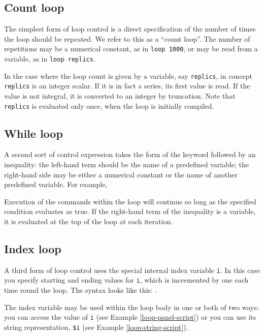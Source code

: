 \subsection{Count loop}
\label{loop-count}

The simplest form of loop control is a direct specification of the
number of times the loop should be repeated.  We refer to this as a
``count loop''.  The number of repetitions may be a numerical
constant, as in \verb+loop 1000+, or may be read from a variable, as
in \verb+loop replics+.

In the case where the loop count is given by a variable, say
\verb+replics+, in concept \verb+replics+ is an integer scalar.  If it
is in fact a series, its first value is read.  If the value is not
integral, it is converted to an integer by truncation.  Note that
\verb+replics+ is evaluated only once, when the loop is initially
compiled.
      

\subsection{While loop}
\label{loop-while}

A second sort of control expression takes the form of the keyword
 followed by an inequality: the left-hand term should be
the name of a predefined variable; the right-hand side may be either a
numerical constant or the name of another predefined variable.  For
example, 


Execution of the commands within the loop will continue so long as the
specified condition evaluates as true. If the right-hand term of the
inequality is a variable, it is evaluated at the top of the loop at
each iteration.

\subsection{Index loop}
\label{loop-index}

A third form of loop control uses the special internal index variable
\verb+i+.  In this case you specify starting and ending values for
\verb+i+, which is incremented by one each time round the loop.  The
syntax looks like this: .

The index variable may be used within the loop body in one or both of
two ways: you can access the value of \verb+i+ (see Example
\ref{loop-panel-script}) or you can use its string representation,
\verb+$i+ (see Example \ref{loop-string-script}).


